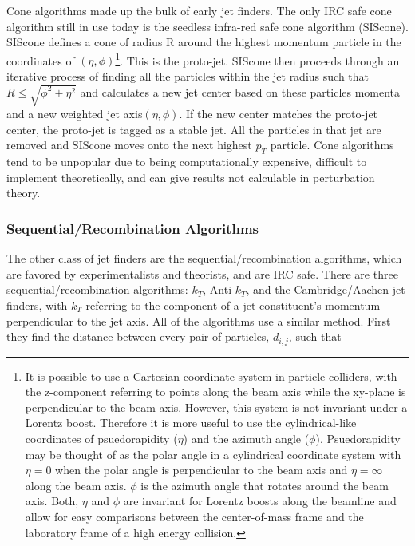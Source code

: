Cone algorithms made up the bulk of early jet finders.  The only IRC safe cone algorithm still in use today is the seedless infra-red safe cone algorithm (SIScone).  SIScone defines a cone of radius R around the highest momentum particle in the coordinates of $(\eta,\phi)$\footnote{It is possible to use a Cartesian coordinate system in particle colliders, with the z-component referring to points along the beam axis while the xy-plane is perpendicular to the beam axis.  However, this system is not invariant under a Lorentz boost.  Therefore it is more useful to use the cylindrical-like coordinates of psuedorapidity ($\eta$) and the azimuth angle ($\phi$). Psuedorapidity may be thought of as the polar angle in a cylindrical coordinate system with $\eta = 0$ when the polar angle is perpendicular to the beam axis and $\eta = \infty$ along the beam axis.  $\phi$ is the azimuth angle that rotates around the beam axis.  Both, $\eta$ and $\phi$ are invariant for Lorentz boosts along the beamline and allow for easy comparisons between the center-of-mass frame and the laboratory frame of a high energy collision.}.  This is the proto-jet.  SIScone then proceeds through an iterative process of finding all the particles within the jet radius such that $R \leq \sqrt{\phi^{2} + \eta^{2}}$ and calculates a new jet center based on these particles momenta and a new weighted jet axis$(\eta,\phi)$.  If the new center matches the proto-jet center, the proto-jet is tagged as a stable jet.  All the particles in that jet are removed and SIScone moves onto the next highest $p_{T}$ particle.  Cone algorithms tend to be unpopular due to being computationally expensive, difficult to implement theoretically, and can give results not calculable in perturbation theory.

\subsubsection{Sequential/Recombination Algorithms}

The other class of jet finders are the sequential/recombination algorithms, which are favored by experimentalists and theorists, and are IRC safe.  There are three sequential/recombination algorithms: $k_{T}$, Anti-$k_{T}$, and the Cambridge/Aachen jet finders, with $k_{T}$ referring to the component of a jet constituent's momentum perpendicular to the jet axis.  All of the algorithms use a similar method.  First they find the distance between every pair of particles, $d_{i,j}$,  such that



